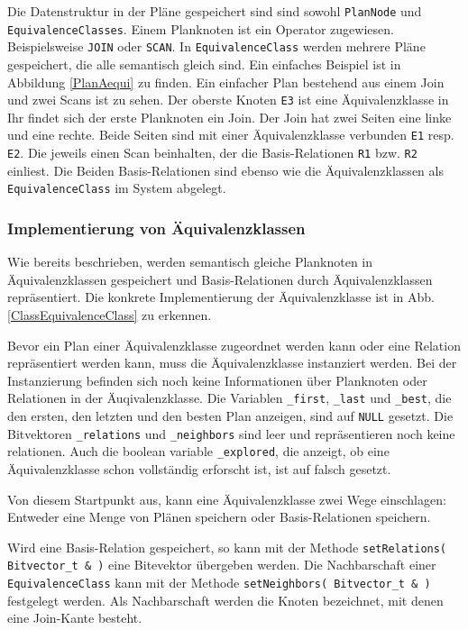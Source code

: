 Die Datenstruktur in der Pläne gespeichert sind sind sowohl \texttt{Plan\-Node} und \texttt{Equi\-valence\-Classes}. Einem Planknoten ist ein Operator zugewiesen. Beispielsweise \texttt{JOIN} oder \texttt{SCAN}. In \texttt{Equi\-valence\-Class} werden mehrere Pläne gespeichert, die alle semantisch gleich sind. Ein einfaches Beispiel ist in Abbildung \ref{PlanAequi} zu finden. Ein einfacher Plan bestehend aus einem Join und zwei Scans ist zu sehen. Der oberste Knoten \texttt{E3} ist eine Äquivalenzklasse in Ihr findet sich der erste Planknoten ein Join. Der Join hat zwei Seiten eine linke und eine rechte. Beide Seiten sind mit einer Äquivalenzklasse verbunden \texttt{E1} resp. \texttt{E2}. Die jeweils einen Scan beinhalten, der die Basis-Relationen \texttt{R1} bzw. \texttt{R2} einliest. Die Beiden Basis-Relationen sind ebenso wie die Äquivalenzklassen als \texttt{Equi\-valence\-Class} im System abgelegt.




\subsubsection{Implementierung von Äquivalenzklassen}

Wie bereits beschrieben, werden semantisch gleiche Planknoten in Äquivalenzklassen gespeichert und Basis-Relationen durch Äquivalenzklassen repräsentiert. Die konkrete Implementierung der Äquivalenzklasse ist in Abb. \ref{ClassEquivalenceClass} zu erkennen.

Bevor ein Plan einer Äquivalenzklasse zugeordnet werden kann oder eine Relation repräsentiert werden kann, muss die Äquivalenzklasse instanziert werden. Bei der Instanzierung befinden sich noch keine Informationen über Planknoten oder Relationen in der Äuqivalenzklasse. Die Variablen \texttt{\_first}, \texttt{\_last} und \texttt{\_best}, die den ersten, den letzten und den besten Plan anzeigen, sind auf \texttt{NULL} gesetzt. Die Bitvektoren \texttt{\_relations} und \texttt{\_neighbors} sind leer und repräsentieren noch keine relationen. Auch die boolean variable \texttt{\_explored}, die anzeigt, ob eine Äquivalenzklasse schon vollständig erforscht ist, ist auf falsch gesetzt.


Von diesem Startpunkt aus, kann eine Äquivalenzklasse zwei Wege einschlagen: Entweder eine Menge von Plänen speichern oder Basis-Relationen speichern. 

Wird eine Basis-Relation gespeichert, so kann mit der Methode \texttt{setRelations( Bitvector\_t \& )} eine Bitevektor übergeben werden. Die Nachbarschaft einer \texttt{Equi\-valence\-Class} kann mit der Methode \texttt{setNeighbors( Bitvector\_t \& )} festgelegt werden. Als Nachbarschaft werden die Knoten bezeichnet, mit denen eine Join-Kante besteht.


